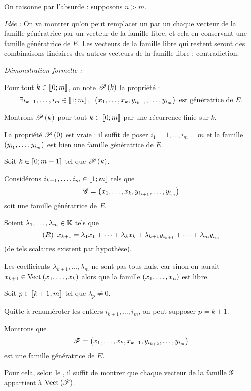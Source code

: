 \begin{dem}
On raisonne par l'absurde : supposons \(n>m\).

\textit{Idée :} On va montrer qu'on peut remplacer un par un chaque vecteur de la famille génératrice par un vecteur de la famille libre, et cela en conservant une famille génératrice de \(E\). Les vecteurs de la famille libre qui restent seront des combinaisons linéaires des autres vecteurs de la famille libre : contradiction.

\textit{Démonstration formelle :}

Pour tout \(k\in\interventierii{0}{m}\), on note \(\P{k}\) la propriété : \[\quantifs{\exists i_{k+1},\dots,i_m\in\interventierii{1}{m}}\paren{x_1,\dots,x_k,y_{i_{k+1}},\dots,y_{i_m}}\text{ est génératrice de }E.\]

Montrons \(\P{k}\) pour tout \(k\in\interventierii{0}{m}\) par une récurrence finie sur \(k\).

La propriété \(\P{0}\) est vraie : il suffit de poser \(i_1=1,\dots,i_m=m\) et la famille \(\paren{y_{i_1},\dots,y_{i_m}}\) est bien une famille génératrice de \(E\).

Soit \(k\in\interventierii{0}{m-1}\) tel que \(\P{k}\).

Considérons \(i_{k+1},\dots,i_m\in\interventierii{1}{m}\) tels que \[\fami{G}=\paren{x_1,\dots,x_k,y_{i_{k+1}},\dots,y_{i_m}}\] soit une famille génératrice de \(E\).

Soient \(\lambda_1,\dots,\lambda_m\in\K\) tels que \[\paren{R}~x_{k+1}=\lambda_1x_1+\dots+\lambda_kx_k+\lambda_{k+1}y_{i_{k+1}}+\dots+\lambda_my_{i_m}\] (de tels scalaires existent par hypothèse).

Les coefficients \(\lambda_{k+1},\dots,\lambda_m\) ne sont pas tous nuls, car sinon on aurait \(x_{k+1}\in\Vect{x_1,\dots,x_k}\) alors que la famille \(\paren{x_1,\dots,x_n}\) est libre.

Soit \(p\in\interventierii{k+1}{m}\) tel que \(\lambda_p\not=0\).

Quitte à renuméroter les entiers \(i_{k+1},\dots,i_m\), on peut supposer \(p=k+1\).

Montrons que \[\fami{F}=\paren{x_1,\dots,x_k,x_{k+1},y_{i_{k+2}},\dots,y_{i_m}}\] est une famille génératrice de \(E\).

Pour cela, selon le , il suffit de montrer que chaque vecteur de la famille \(\fami{G}\) appartient à \(\Vect{\fami{F}}\).


\end{dem}
